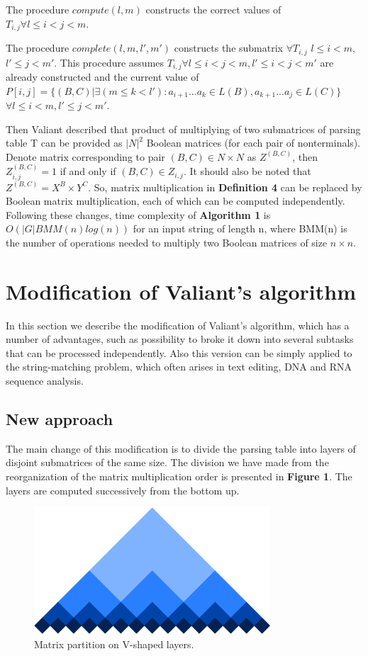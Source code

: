 \documentclass[runningheads]{llncs}
\begin{document}
The procedure $compute(l, m)$ constructs the correct values of $T_{i,j} \forall l \le i < j < m$.

The procedure $complete(l, m, l', m')$ constructs the submatrix $\forall T_{i, j}$ $l \le i < m$, $l' \le j < m'$. This procedure assumes $T_{i, j} \forall l \leq i < j < m,  l' \leq i < j < m'$ are already constructed and the current value of  $P[i, j] =  \{ (B, C) |\exists (m \le k < l'): a_{i + 1}...a_{k} \in L(B), a_{k + 1}...a_{j} \in L(C)\}$ $\forall l \leq i < m,  l' \leq j < m'$. 

Then Valiant described that product of multiplying of two submatrices of parsing table T can be provided as $|N|^2$ Boolean matrices (for each pair of nonterminals). Denote matrix corresponding to pair $(B, C) \in N \times N$ as $Z^{(B, C)}$, then $Z_{i, j}^{(B, C)} = 1$ if and only if $(B, C) \in Z_{i, j}$. It should also be noted that $Z^{(B, C)} = X^{B} \times Y^{C}$. So, matrix multiplication in \textbf{Definition 4} can be replaced by Boolean matrix multiplication, each of which can be computed independently. Following these changes, time complexity of \textbf{Algorithm 1} is $O(|G|BMM(n)log(n))$ for an input string of length n, where BMM(n) is the number of operations needed to multiply two Boolean matrices of size $n \times n$.

\section{Modification of Valiant's algorithm}
 
In this section we describe the modification of Valiant's algorithm, which has a number of advantages, such as possibility to broke it down into several subtasks that can be processed independently. Also this version can be simply applied to the string-matching problem, which often arises in text editing, DNA and RNA sequence analysis.

\subsection{New approach}
 
The main change of this modification is to divide the parsing table into layers of disjoint submatrices of the same size.
The division we have made from the reorganization of the matrix multiplication order is presented in \textbf{Figure 1}. 
The layers are computed successively from the bottom up.

\begin{figure}[h]
\includegraphics[width=250pt]{drawing.eps}
\centering
\caption{Matrix partition on V-shaped layers.} \label{fig1}
\end{figure}
\end{document}
